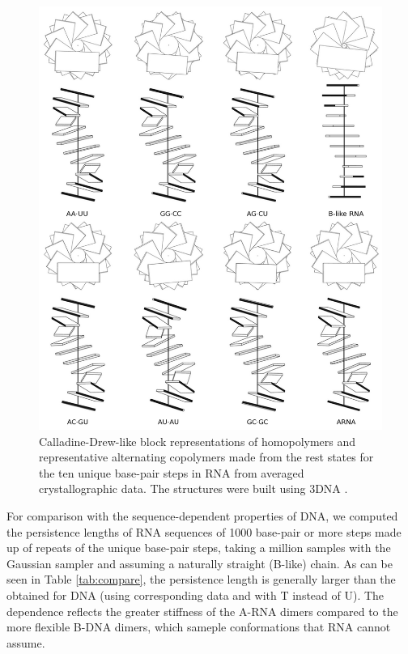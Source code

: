 \begin{figure}
\centering
\includegraphics[angle=0, scale=3.0]{Chapter4/homohetero.png}
\caption{Calladine-Drew-like           block           representations
  \cite{calladine1997} of  homopolymers and representative alternating
  copolymers made  from the rest  states for the ten  unique base-pair
  steps  in RNA  from averaged  crystallographic data.  The structures
  were built using 3DNA \cite{lu2003}.}
\label{fig:homohetero}
\end{figure}

For  comparison  with the  sequence-dependent  properties  of DNA,  we
computed the persistence lengths of RNA sequences of 1000 base-pair or
more steps made up of repeats  of the unique base-pair steps, taking a
million  samples with the  Gaussian sampler  and assuming  a naturally
straight (B-like)  chain. As can  be seen in  Table \ref{tab:compare},
the persistence length  is generally larger than the  obtained for DNA
(using corresponding  data and with  T instead of U).   The dependence
reflects the  greater stiffness  of the A-RNA  dimers compared  to the
more  flexible  B-DNA dimers,  which  sameple  conformations that  RNA
cannot assume.

